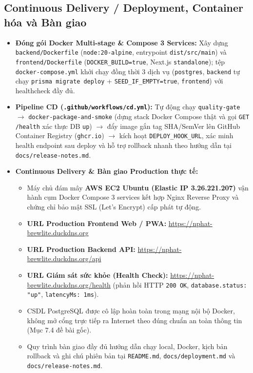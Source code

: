 \documentclass[a4paper,12pt]{article}
\begin{document}
\subsection{Continuous Delivery / Deployment, Container hóa và Bàn giao}
\begin{itemize}
  \item \textbf{Đóng gói Docker Multi-stage \& Compose 3 Services:} Xây dựng \texttt{backend/Dockerfile} (\texttt{node:20-alpine}, entrypoint \texttt{dist/src/main}) và \texttt{frontend/Dockerfile} (\texttt{DOCKER\_BUILD=true}, Next.js \texttt{standalone}); tệp \texttt{docker-compose.yml} khởi chạy đồng thời 3 dịch vụ (\texttt{postgres}, \texttt{backend} tự chạy \texttt{prisma migrate deploy} + \texttt{SEED\_IF\_EMPTY=true}, \texttt{frontend}) với healthcheck đầy đủ.
  \item \textbf{Pipeline CD (\texttt{.github/workflows/cd.yml}):} Tự động chạy \texttt{quality-gate} $\rightarrow$ \texttt{docker-package-and-smoke} (dựng stack Docker Compose thật và gọi \texttt{GET /health} xác thực DB \texttt{up}) $\rightarrow$ đẩy image gắn tag SHA/SemVer lên GitHub Container Registry (\texttt{ghcr.io}) $\rightarrow$ kích hoạt \texttt{DEPLOY\_HOOK\_URL}, xác minh health endpoint sau deploy và hỗ trợ rollback nhanh theo hướng dẫn tại \texttt{docs/release-notes.md}.
  \item \textbf{Continuous Delivery \& Bàn giao Production thực tế:} 
    \begin{itemize}
      \item Máy chủ đám mây \textbf{AWS EC2 Ubuntu (Elastic IP 3.26.221.207)} vận hành cụm Docker Compose 3 services kết hợp Nginx Reverse Proxy và chứng chỉ bảo mật SSL (Let's Encrypt) cấp phát tự động.
      \item \textbf{URL Production Frontend Web / PWA:} \url{https://nphat-brewlite.duckdns.org}
      \item \textbf{URL Production Backend API:} \url{https://nphat-brewlite.duckdns.org/api}
      \item \textbf{URL Giám sát sức khỏe (Health Check):} \url{https://nphat-brewlite.duckdns.org/health} (phản hồi HTTP \texttt{200 OK}, \texttt{database.status: "up"}, \texttt{latencyMs: 1ms}).
      \item CSDL PostgreSQL được cô lập hoàn toàn trong mạng nội bộ Docker, không mở cổng trực tiếp ra Internet theo đúng chuẩn an toàn thông tin (Mục 7.4 đề bài gốc).
      \item Quy trình bàn giao đầy đủ hướng dẫn chạy local, Docker, kịch bản rollback và ghi chú phiên bản tại \texttt{README.md}, \texttt{docs/deployment.md} và \texttt{docs/release-notes.md}.
    \end{itemize}
\end{itemize}
\end{document}
